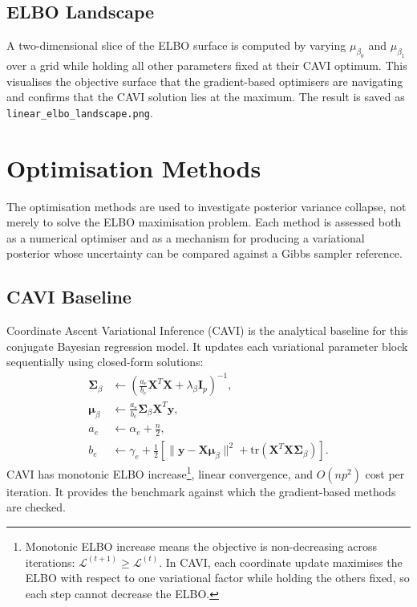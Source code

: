 \documentclass[11pt,a4paper]{article}
\newcommand{\tr}{\text{tr}}
\begin{document}
\subsection{ELBO Landscape}

A two-dimensional slice of the ELBO surface is computed by varying $\mu_{\beta_0}$ and $\mu_{\beta_1}$
over a grid while holding all other parameters fixed at their CAVI optimum.
This visualises the objective surface that the gradient-based optimisers are navigating and confirms
that the CAVI solution lies at the maximum.
The result is saved as \texttt{linear\_elbo\_landscape.png}.

\section{Optimisation Methods}

The optimisation methods are used to investigate posterior variance collapse, not merely to solve the ELBO maximisation problem. Each method is assessed both as a numerical optimiser and as a mechanism for producing a variational posterior whose uncertainty can be compared against a Gibbs sampler reference.

\subsection{CAVI Baseline}

Coordinate Ascent Variational Inference (CAVI) is the analytical baseline for this conjugate Bayesian regression model. It updates each variational parameter block sequentially using closed-form solutions:
\begin{align}
\bm{\Sigma}_\beta &\leftarrow \left(\frac{a_e}{b_e} \bm{X}^T\bm{X} + \lambda_\beta \bm{I}_p\right)^{-1},\\
\bm{\mu}_\beta &\leftarrow \frac{a_e}{b_e} \bm{\Sigma}_\beta \bm{X}^T\bm{y},\\
a_e &\leftarrow \alpha_e + \frac{n}{2},\\
b_e &\leftarrow \gamma_e + \frac{1}{2}\left[\|\bm{y} - \bm{X}\bm{\mu}_\beta\|^2 + \tr(\bm{X}^T\bm{X}\bm{\Sigma}_\beta)\right].
\end{align}
CAVI has monotonic ELBO increase\footnote{Monotonic ELBO increase means the objective is non-decreasing across iterations: $\mathcal{L}^{(t+1)} \geq \mathcal{L}^{(t)}$. In CAVI, each coordinate update maximises the ELBO with respect to one variational factor while holding the others fixed, so each step cannot decrease the ELBO.}, linear convergence, and $O(np^2)$ cost per iteration. It provides the benchmark against which the gradient-based methods are checked.
\end{document}
